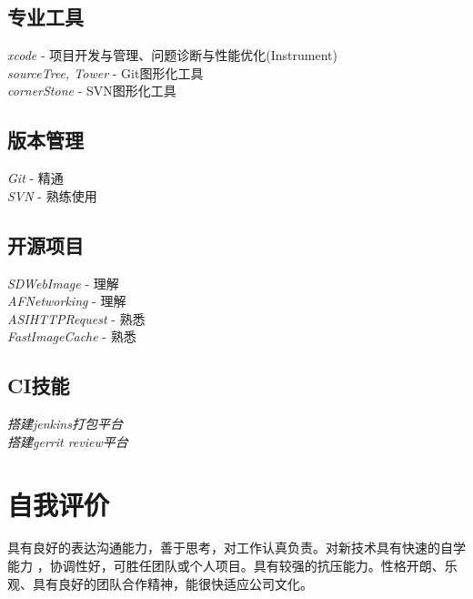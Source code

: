 \documentclass[]{deedy-resume-document-class}
\begin{document}
\begin{minipage}[t]{0.33\textwidth}
\bigskip

\subsection{专业工具}
\textit{xcode} - 项目开发与管理、问题诊断与性能优化(Instrument)\\
\textit{sourceTree, Tower} - Git图形化工具\\
\textit{cornerStone} - SVN图形化工具\\

\bigskip

\subsection{版本管理}
\textit{Git} - 精通\\
\textit{SVN} - 熟练使用\\

\bigskip

\subsection{开源项目}
\textit{SDWebImage}     - 理解\\
\textit{AFNetworking}   - 理解\\
\textit{ASIHTTPRequest} - 熟悉\\
\textit{FastImageCache} - 熟悉\\

\bigskip

\subsection{CI技能}
\textit{搭建jenkins打包平台}\\
\textit{搭建gerrit review平台}\\
\sectionsep




\section{自我评价} 
具有良好的表达沟通能力，善于思考，对工作认真负责。对新技术具有快速的自学能力 ，协调性好，可胜任团队或个人项目。具有较强的抗压能力。性格开朗、乐观、具有良好的团队合作精神，能很快适应公司文化。
\sectionsep


%
%

\end{minipage} 
\end{document}
